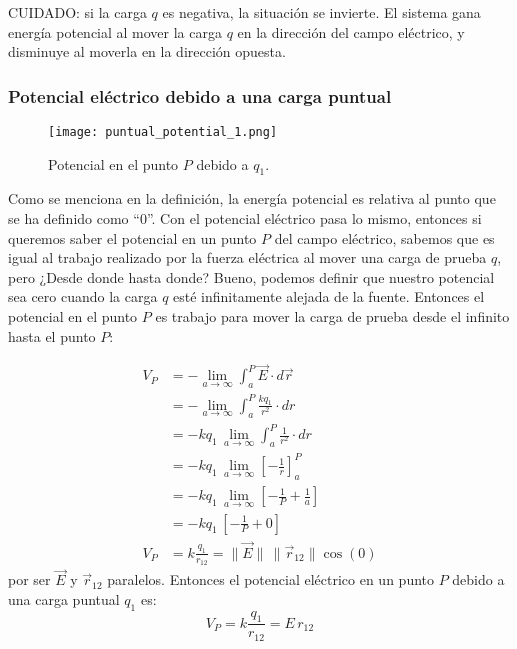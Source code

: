 \begin{tcolorbox}[mydanger]
    CUIDADO: si la carga \(q\) es negativa, la situación se invierte. El sistema gana energía potencial al mover la carga \(q\) en la dirección del campo eléctrico, y disminuye al moverla en la dirección opuesta.    
\end{tcolorbox}

\subsubsection{Potencial eléctrico debido a una carga puntual}

\begin{wrapfigure}{l}{0.32\textwidth}
    \centering
    \texttt{[image: puntual\_potential\_1.png]}
    \caption{Potencial en el punto \(P\) debido a \(q_1\).}
    \label{fig:potential_point_charge}
\end{wrapfigure}

Como se menciona en la definición, la energía potencial es relativa al punto que se ha definido como ``0''. Con  el potencial eléctrico pasa lo mismo, entonces si queremos saber el potencial en un punto \(P\) del campo eléctrico, sabemos que es igual al trabajo realizado por la fuerza eléctrica al mover una carga de prueba \(q\), pero ¿Desde donde hasta donde? Bueno, podemos definir que nuestro potencial sea cero cuando la carga \(q\) esté infinitamente alejada de la fuente. Entonces el potencial en el punto \(P\) es trabajo para mover la carga de prueba desde el infinito hasta el punto \(P\):

\begin{align*}
    V_P &= - \lim_{a \to \infty}\int_{a}^P \vec{E} \cdot d\vec{r}\\
        &= - \lim_{a \to \infty}\int_{a}^P \frac{kq_1}{r^2} \cdot dr\\
        &= -kq_1 \, \lim_{a \to \infty} \int_{a}^P \frac{1}{r^2} \cdot dr\\
        &= -kq_1 \, \lim_{a \to \infty} \left[ -\frac{1}{r} \right]_{a}^P\\
        &= -kq_1 \, \lim_{a \to \infty} \left[ -\frac{1}{P} + \frac{1}{a} \right]\\
        &= -kq_1 \, \left[ -\frac{1}{P} + 0 \right] \\
    V_P &= k\frac{q_1}{r_{12}} = \lVert\vec{E}\rVert \, \lVert\vec{r}_{12}\rVert \cos(0)
\end{align*}
por ser \(\vec{E}\) y \(\vec{r}_{12}\) paralelos. Entonces el potencial eléctrico en un punto \(P\) debido a una carga puntual \(q_1\) es:
\begin{equation}
    \boxed{V_P = k\frac{q_1}{r_{12}} = E \, r_{12}}
    \label{eq:potential_point_charge}
\end{equation}

